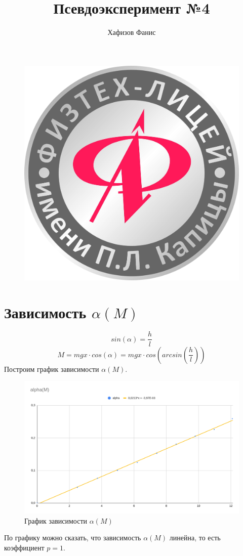 \documentclass[12pt]{article}
\title{Псевдоэксперимент №4}
\author{Хафизов Фанис}
\begin{document}
	\begin{figure}
		\centering
		\includegraphics[width=0.3\linewidth]{logo}
	\end{figure}
	\maketitle
	\newpage
	\section{Зависимость $\alpha(M)$}
	$$sin(\alpha)=\frac{h}{l}$$
	$$M = mgx\cdot cos(\alpha)=mgx\cdot cos(arcsin(\frac{h}{l}))$$
	Построим график зависимости $\alpha(M)$.
	\begin{figure}[H]
		\centering
		\includegraphics[width=\linewidth]{graph1}
		\caption{График зависимости $\alpha(M)$}
	\end{figure}
	По графику можно сказать, что зависимость $\alpha(M)$ линейна, то есть коэффициент $p=1$.
\end{document}

